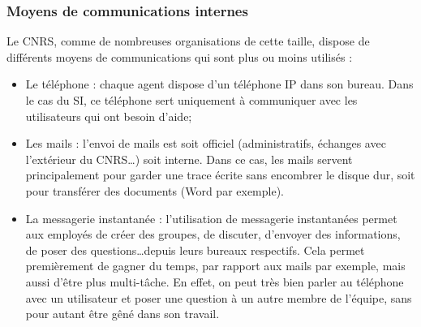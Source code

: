 \subsubsection{Moyens de communications internes}
Le CNRS, comme de nombreuses organisations de cette taille, dispose de différents moyens de communications qui sont plus ou moins utilisés :
\begin{itemize}
    \item Le téléphone : chaque agent dispose d'un téléphone IP dans son bureau. Dans le cas du SI, ce téléphone sert uniquement à communiquer avec les utilisateurs qui ont besoin d'aide;
    \item Les mails : l'envoi de mails est soit officiel (administratifs, échanges avec l'extérieur du CNRS\dots) soit interne. Dans ce cas, les mails servent principalement pour garder une trace écrite sans encombrer le disque dur, soit pour transférer des documents (Word par exemple).
    \item La messagerie instantanée : l'utilisation de messagerie instantanées permet aux employés de créer des groupes, de discuter, d'envoyer des informations, de poser des questions\dots depuis leurs bureaux respectifs. Cela permet premièrement de gagner du temps, par rapport aux mails par exemple, mais aussi d'être plus multi-tâche. En effet, on peut très bien parler au téléphone avec un utilisateur et poser une question à un autre membre de l'équipe, sans pour autant être gêné dans son travail.
\end{itemize}